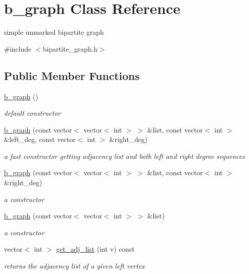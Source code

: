 \hypertarget{classb__graph}{}\section{b\+\_\+graph Class Reference}
\label{classb__graph}


simple unmarked bipartite graph  




{\ttfamily \#include $<$bipartite\+\_\+graph.\+h$>$}

\subsection*{Public Member Functions}
\begin{DoxyCompactItemize}
\item 
\hyperlink{classb__graph_a83ebab7ff22a3cf19c0cf62de3f8b306}{b\+\_\+graph} ()
\begin{DoxyCompactList}\small\item\em default constructor \end{DoxyCompactList}\item 
\hyperlink{classb__graph_a2d8ef8201dcab38f6e3a8ead01ef0448}{b\+\_\+graph} (const vector$<$ vector$<$ int $>$ $>$ \&list, const vector$<$ int $>$ \&left\+\_\+deg, const vector$<$ int $>$ \&right\+\_\+deg)
\begin{DoxyCompactList}\small\item\em a fast constructor getting adjacency list and both left and right degree sequences \end{DoxyCompactList}\item 
\hyperlink{classb__graph_a1d679a9d82fef1457da6bca7f8a19342}{b\+\_\+graph} (const vector$<$ vector$<$ int $>$ $>$ \&list, const vector$<$ int $>$ \&right\+\_\+deg)
\begin{DoxyCompactList}\small\item\em a constructor \end{DoxyCompactList}\item 
\hyperlink{classb__graph_a070770b36a9d003289813dde31238263}{b\+\_\+graph} (const vector$<$ vector$<$ int $>$ $>$ \&list)
\begin{DoxyCompactList}\small\item\em a constructor \end{DoxyCompactList}\item 
vector$<$ int $>$ \hyperlink{classb__graph_aa81c7179b9c6cb4986c4b41e84a85799}{get\+\_\+adj\+\_\+list} (int v) const
\begin{DoxyCompactList}\small\item\em returns the adjacency list of a given left vertex \end{DoxyCompactList}\item 

\end{DoxyCompactItemize}
